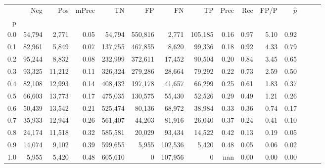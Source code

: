 \begin{tabular}{rrrrrrrrrrrrrrr}
\toprule
{} &     Neg &     Pos & mPrec &       TN &       FP &       FN &       TP &  Prec &   Rec &  FP/P & $\hat{p}$ \\
p   &         &         &       &          &          &          &          &       &       &       &           \\
\midrule
0.0 &  54,794 &   2,771 &  0.05 &   54,794 &  550,816 &    2,771 &  105,185 &  0.16 &  0.97 &  5.10 &      0.92 \\
0.1 &  82,961 &   5,849 &  0.07 &  137,755 &  467,855 &    8,620 &   99,336 &  0.18 &  0.92 &  4.33 &      0.79 \\
0.2 &  95,244 &   8,832 &  0.08 &  232,999 &  372,611 &   17,452 &   90,504 &  0.20 &  0.84 &  3.45 &      0.65 \\
0.3 &  93,325 &  11,212 &  0.11 &  326,324 &  279,286 &   28,664 &   79,292 &  0.22 &  0.73 &  2.59 &      0.50 \\
0.4 &  82,108 &  12,993 &  0.14 &  408,432 &  197,178 &   41,657 &   66,299 &  0.25 &  0.61 &  1.83 &      0.37 \\
0.5 &  66,603 &  13,773 &  0.17 &  475,035 &  130,575 &   55,430 &   52,526 &  0.29 &  0.49 &  1.21 &      0.26 \\
0.6 &  50,439 &  13,542 &  0.21 &  525,474 &   80,136 &   68,972 &   38,984 &  0.33 &  0.36 &  0.74 &      0.17 \\
0.7 &  35,933 &  12,944 &  0.26 &  561,407 &   44,203 &   81,916 &   26,040 &  0.37 &  0.24 &  0.41 &      0.10 \\
0.8 &  24,174 &  11,518 &  0.32 &  585,581 &   20,029 &   93,434 &   14,522 &  0.42 &  0.13 &  0.19 &      0.05 \\
0.9 &  14,074 &   9,102 &  0.39 &  599,655 &    5,955 &  102,536 &    5,420 &  0.48 &  0.05 &  0.06 &      0.02 \\
1.0 &   5,955 &   5,420 &  0.48 &  605,610 &        0 &  107,956 &        0 &   nan &  0.00 &  0.00 &      0.00 \\
\bottomrule
\end{tabular}
